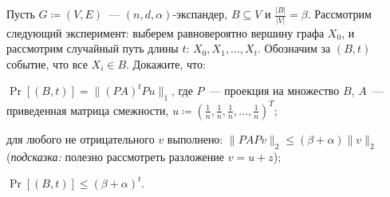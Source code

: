 Пусть $G \coloneqq (V, E)$~--- $(n, d, \alpha)$-экспандер, $B \subseteq V$ и $\frac{|B|}{|V|} =
\beta$. Рассмотрим следующий эксперимент: выберем равновероятно вершину графа $X_0$, и рассмотрим
случайный путь длины $t$: $X_0, X_1, \dots, X_t$. Обозначим за $(B, t)$ событие, что все $X_i \in
B$. Докажите, что:
\begin{enumcyr}
    \item $\Pr[(B, t)] = \|(PA)^tP u\|_1$, где $P$~--- проекция на множество $B$, $A$~--- приведенная
        матрица смежности, $u \coloneqq \left(\frac{1}{n}, \frac{1}{n}, \frac{1}{n}, \dots,
        \frac{1}{n}\right)^{T}$;
    \item для любого не отрицательного $v$ выполнено: $\|PAP v\|_2 \le (\beta + \alpha) \|v\|_2$
        (\textit{подсказка:} полезно рассмотреть разложение $v = u + z$);
    \item $\Pr[(B, t)] \le (\beta + \alpha)^t$.
\end{enumcyr}